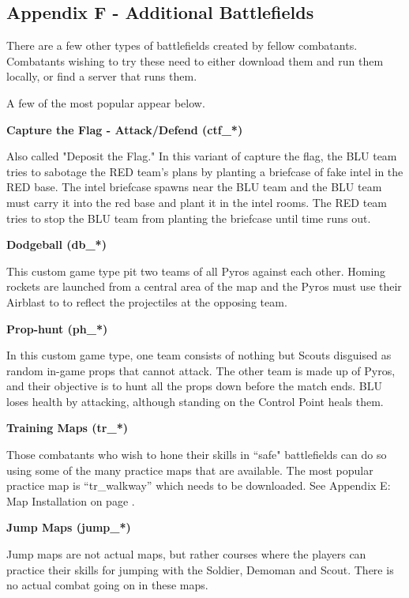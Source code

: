 \subsection{Appendix F - Additional Battlefields}
\label{Additional_Battlefields}
There are a few other types of battlefields created by fellow combatants.  Combatants wishing to try these need to either download them and run them locally, or find a server that runs them.

A few of the most popular appear below.

{\bf Capture the Flag - Attack/Defend (ctf\_*)}

Also called "Deposit the Flag." In this variant of capture the flag, the BLU team tries to sabotage the RED team's plans by planting a briefcase of fake intel in the RED base. The intel briefcase spawns near the BLU team and the BLU team must carry it into the red base and plant it in the intel rooms. The RED team tries to stop the BLU team from planting the briefcase until time runs out.

{\bf Dodgeball (db\_*)}

This custom game type pit two teams of all Pyros against each other. Homing rockets are launched from a central area of the map and the Pyros must use their Airblast to to reflect the projectiles at the opposing team.

{\bf Prop-hunt (ph\_*)}

In this custom game type, one team consists of nothing but Scouts disguised as random in-game props that cannot attack. The other team is made up of Pyros, and their objective is to hunt all the props down before the match ends. BLU loses health by attacking, although standing on the Control Point heals them.

{\bf Training Maps (tr\_*)}

Those combatants who wish to hone their skills in “safe" battlefields can do so using some of the many practice maps that are available.  The most popular practice map is “tr\_walkway” which needs to be downloaded.  See Appendix E: Map Installation on page \pageref{map_install}.

{\bf Jump Maps (jump\_*)}

Jump maps are not actual maps, but rather courses where the players can practice their skills for jumping with the Soldier, Demoman and Scout. There is no actual combat going on in these maps.